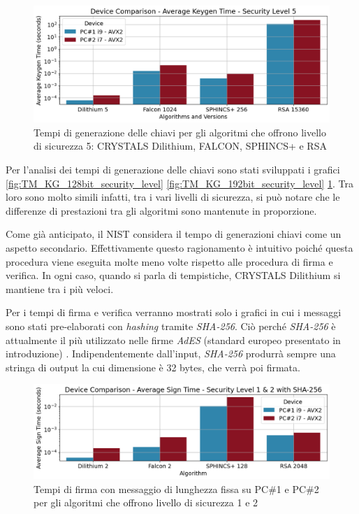 \begin{figure}[H]
    \centering
    \includegraphics[width=1\textwidth]{Immagini/comparison/Time_Keygen/TM_KG_256bit_security_level.png}
    \caption{Tempi di generazione delle chiavi per gli algoritmi che offrono livello di sicurezza 5: CRYSTALS Dilithium, FALCON, SPHINCS+ e RSA}
    \label{fig:TM_KG_256bit_security_level}
\end{figure}

Per l'analisi dei tempi di generazione delle chiavi sono stati sviluppati i grafici \ref{fig:TM_KG_128bit_security_level} \ref{fig:TM_KG_192bit_security_level} \ref{fig:TM_KG_256bit_security_level}. Tra loro sono molto simili infatti, tra i vari livelli di sicurezza, si può notare che le differenze di prestazioni tra gli algoritmi sono mantenute in proporzione.

Come già anticipato, il NIST considera il tempo di generazioni chiavi come un aspetto secondario. Effettivamente questo ragionamento è intuitivo poiché questa procedura viene eseguita molte meno volte rispetto alle procedura di firma e verifica. In ogni caso, quando si parla di tempistiche, CRYSTALS Dilithium si mantiene tra i più veloci.

Per i tempi di firma e verifica verranno mostrati solo i grafici in cui i messaggi sono stati pre-elaborati con \textit{hashing} tramite \textit{SHA-256}. Ciò perché \textit{SHA-256} è attualmente il più utilizzato nelle firme \textit{AdES} (standard europeo presentato in introduzione) \cite{etsi_ts_119312}.
Indipendentemente dall'input, \textit{SHA-256} produrrà sempre una stringa di output la cui dimensione è 32 bytes, che verrà poi firmata.

\begin{figure}[H]
    \centering
    \includegraphics[width=1\textwidth]{Immagini/comparison/Time_Sign/TM_SG_H_128bit_security_level_sha256}
    \caption{Tempi di firma con messaggio di lunghezza fissa su PC\#1 e PC\#2 per gli algoritmi che offrono livello di sicurezza 1 e 2}
    \label{fig:TM_SG_H_128bit_security_level_sha256}
\end{figure}

